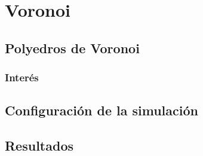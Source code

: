 
\chapter{Voronoi} %

\label{Chapter4} %



\section{Polyedros de Voronoi}



\subsection{Inter\'es}



\section{Configuraci\'on de la simulaci\'on}



\section{Resultados}